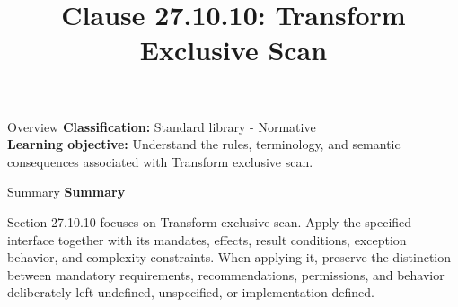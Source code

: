 \documentclass[10pt,letterpaper]{article}
\title{Clause 27.10.10: Transform Exclusive Scan}
\author{}
\date{}
\begin{document}
\maketitle
\begin{CornellOverviewBox}{Overview}
\textbf{Classification:} Standard library - Normative\\[2pt]
\textbf{Learning objective:} Understand the rules, terminology, and semantic consequences associated with Transform exclusive scan.
\end{CornellOverviewBox}\begin{CornellSummaryBox}{Summary}
{\sffamily\bfseries\color{Accent} Summary}\par\vspace{3pt}Section 27.10.10 focuses on Transform exclusive scan. Apply the specified interface together with its mandates, effects, result conditions, exception behavior, and complexity constraints. When applying it, preserve the distinction between mandatory requirements, recommendations, permissions, and behavior deliberately left undefined, unspecified, or implementation-defined.
\end{CornellSummaryBox}
\end{document}
